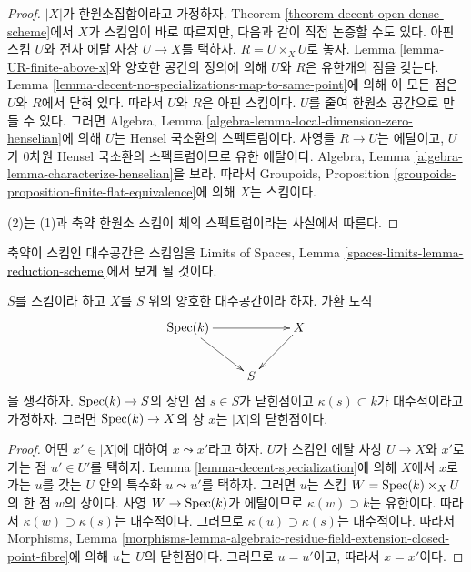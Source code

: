 \begin{proof}
$|X|$가 한원소집합이라고 가정하자. Theorem
\ref{theorem-decent-open-dense-scheme}에서 $X$가 스킴임이 바로 따르지만,
다음과 같이 직접 논증할 수도 있다. 아핀 스킴 $U$와 전사 에탈 사상
$U \to X$를 택하자. $R = U \times_X U$로 놓자. Lemma
\ref{lemma-UR-finite-above-x}와 양호한 공간의 정의에 의해 $U$와 $R$은
유한개의 점을 갖는다. Lemma
\ref{lemma-decent-no-specializations-map-to-same-point}에 의해 이 모든
점은 $U$와 $R$에서 닫혀 있다. 따라서 $U$와 $R$은 아핀 스킴이다.
$U$를 줄여 한원소 공간으로 만들 수 있다. 그러면 Algebra, Lemma
\ref{algebra-lemma-local-dimension-zero-henselian}에 의해 $U$는 Hensel
국소환의 스펙트럼이다. 사영들 $R \to U$는 에탈이고, $U$가 $0$차원
Hensel 국소환의 스펙트럼이므로 유한 에탈이다. Algebra, Lemma
\ref{algebra-lemma-characterize-henselian}을 보라. 따라서 Groupoids,
Proposition \ref{groupoids-proposition-finite-flat-equivalence}에 의해
$X$는 스킴이다.

\medskip\noindent
(2)는 (1)과 축약 한원소 스킴이 체의 스펙트럼이라는 사실에서 따른다.
\end{proof}

\begin{remark}
\label{remark-one-point-decent-scheme}
축약이 스킴인 대수공간은 스킴임을 Limits of Spaces, Lemma
\ref{spaces-limits-lemma-reduction-scheme}에서 보게 될 것이다.
\end{remark}

\begin{lemma}
\label{lemma-algebraic-residue-field-extension-closed-point}
$S$를 스킴이라 하고 $X$를 $S$ 위의 양호한 대수공간이라 하자.
가환 도식
$$
\xymatrix{
\Spec(k) \ar[rr] \ar[rd] & & X \ar[ld] \\
& S
}
$$
을 생각하자. $\mathop{\mathrm{Spec}}(k) \to S$의 상인 점 $s \in S$가 닫힌점이고
$\kappa(s) \subset k$가 대수적이라고 가정하자. 그러면
$\mathop{\mathrm{Spec}}(k) \to X$의 상 $x$는 $|X|$의 닫힌점이다.
\end{lemma}

\begin{proof}
어떤 $x' \in |X|$에 대하여 $x \leadsto x'$라고 하자. $U$가 스킴인
에탈 사상 $U \to X$와 $x'$로 가는 점 $u' \in U'$를 택하자.
Lemma \ref{lemma-decent-specialization}에 의해 $X$에서 $x$로 가는
$u$를 갖는 $U$ 안의 특수화 $u \leadsto u'$를 택하자. 그러면 $u$는
스킴 $W = \mathop{\mathrm{Spec}}(k) \times_X U$의 한 점 $w$의 상이다. 사영
$W \to \mathop{\mathrm{Spec}}(k)$가 에탈이므로 $\kappa(w) \supset k$는 유한이다.
따라서 $\kappa(w) \supset \kappa(s)$는 대수적이다. 그러므로
$\kappa(u) \supset \kappa(s)$는 대수적이다. 따라서 Morphisms, Lemma
\ref{morphisms-lemma-algebraic-residue-field-extension-closed-point-fibre}에
의해 $u$는 $U$의 닫힌점이다. 그러므로 $u = u'$이고, 따라서
$x = x'$이다.
\end{proof}

